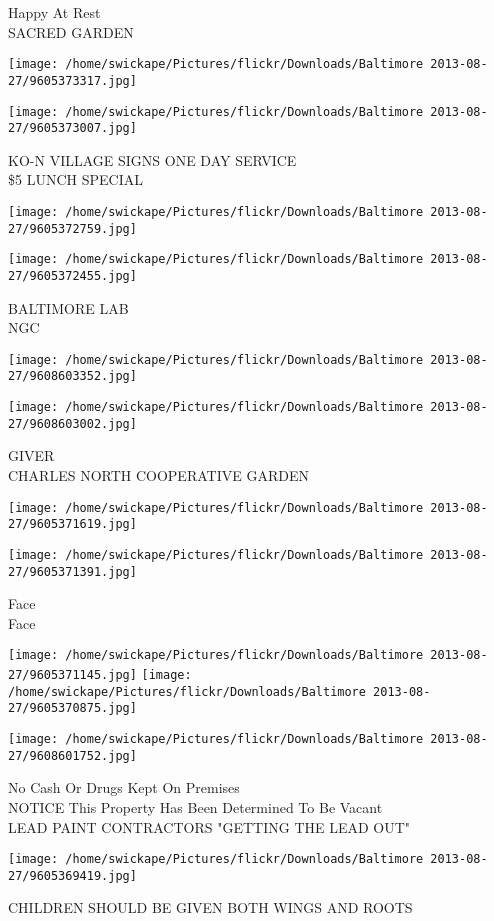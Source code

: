 \documentclass[10pt,letterpaper]{article}
\begin{document}
Happy At Rest\\
SACRED GARDEN
\pagebreak

\texttt{[image: /home/swickape/Pictures/flickr/Downloads/Baltimore 2013-08-27/9605373317.jpg]}

\vspace{0.25in}
\texttt{[image: /home/swickape/Pictures/flickr/Downloads/Baltimore 2013-08-27/9605373007.jpg]}

KO{-}N VILLAGE SIGNS ONE DAY SERVICE\\
\$5 LUNCH SPECIAL
\pagebreak

\texttt{[image: /home/swickape/Pictures/flickr/Downloads/Baltimore 2013-08-27/9605372759.jpg]}

\vspace{0.25in}
\texttt{[image: /home/swickape/Pictures/flickr/Downloads/Baltimore 2013-08-27/9605372455.jpg]}

BALTIMORE LAB\\
NGC
\pagebreak

\texttt{[image: /home/swickape/Pictures/flickr/Downloads/Baltimore 2013-08-27/9608603352.jpg]}

\vspace{0.25in}
\texttt{[image: /home/swickape/Pictures/flickr/Downloads/Baltimore 2013-08-27/9608603002.jpg]}

GIVER\\
CHARLES NORTH COOPERATIVE GARDEN
\pagebreak

\texttt{[image: /home/swickape/Pictures/flickr/Downloads/Baltimore 2013-08-27/9605371619.jpg]}

\vspace{0.25in}
\texttt{[image: /home/swickape/Pictures/flickr/Downloads/Baltimore 2013-08-27/9605371391.jpg]}

Face\\
Face
\pagebreak

\texttt{[image: /home/swickape/Pictures/flickr/Downloads/Baltimore 2013-08-27/9605371145.jpg]}
\texttt{[image: /home/swickape/Pictures/flickr/Downloads/Baltimore 2013-08-27/9605370875.jpg]}

\vspace{0.25in}
\texttt{[image: /home/swickape/Pictures/flickr/Downloads/Baltimore 2013-08-27/9608601752.jpg]}

No Cash Or Drugs Kept On Premises\\
NOTICE This Property Has Been Determined To Be Vacant\\
LEAD PAINT CONTRACTORS "GETTING THE LEAD OUT"
\pagebreak

\texttt{[image: /home/swickape/Pictures/flickr/Downloads/Baltimore 2013-08-27/9605369419.jpg]}

CHILDREN SHOULD BE GIVEN BOTH WINGS AND ROOTS
\pagebreak
\end{document}
